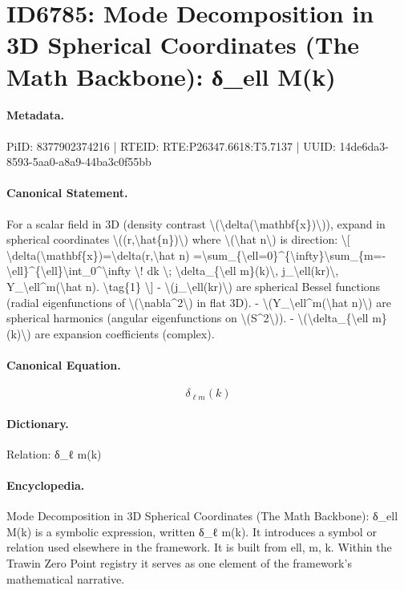 \section*{ID6785: Mode Decomposition in 3D Spherical Coordinates (The Math Backbone): δ\_ell M(k)}
\paragraph{Metadata.}
PiID: 8377902374216 | RTEID: RTE:P26347.6618:T5.7137 | UUID: 14de6da3-8593-5aa0-a8a9-44ba3c0f55bb

\paragraph{Canonical Statement.}
For a scalar field in 3D (density contrast \textbackslash{}(\textbackslash{}delta(\textbackslash{}mathbf\{x\})\textbackslash{})), expand in spherical coordinates \textbackslash{}((r,\textbackslash{}hat\{n\})\textbackslash{}) where \textbackslash{}(\textbackslash{}hat n\textbackslash{}) is direction: \textbackslash{}[ \textbackslash{}delta(\textbackslash{}mathbf\{x\})=\textbackslash{}delta(r,\textbackslash{}hat n) =\textbackslash{}sum\_\{\textbackslash{}ell=0\}\textasciicircum{}\{\textbackslash{}infty\}\textbackslash{}sum\_\{m=-\textbackslash{}ell\}\textasciicircum{}\{\textbackslash{}ell\}\textbackslash{}int\_0\textasciicircum{}\textbackslash{}infty \textbackslash{}! dk \textbackslash{}; \textbackslash{}delta\_\{\textbackslash{}ell m\}(k)\textbackslash{}, j\_\textbackslash{}ell(kr)\textbackslash{}, Y\_\textbackslash{}ell\textasciicircum{}m(\textbackslash{}hat n). \textbackslash{}tag\{1\} \textbackslash{}] - \textbackslash{}(j\_\textbackslash{}ell(kr)\textbackslash{}) are spherical Bessel functions (radial eigenfunctions of \textbackslash{}(\textbackslash{}nabla\textasciicircum{}2\textbackslash{}) in flat 3D). - \textbackslash{}(Y\_\textbackslash{}ell\textasciicircum{}m(\textbackslash{}hat n)\textbackslash{}) are spherical harmonics (angular eigenfunctions on \textbackslash{}(S\textasciicircum{}2\textbackslash{})). - \textbackslash{}(\textbackslash{}delta\_\{\textbackslash{}ell m\}(k)\textbackslash{}) are expansion coefficients (complex).

\paragraph{Canonical Equation.}
\[
\delta_{\ell m}(k)
\]

\paragraph{Dictionary.}
Relation: δ\_ℓ m(k)

\paragraph{Encyclopedia.}
Mode Decomposition in 3D Spherical Coordinates (The Math Backbone): δ\_ell M(k) is a symbolic expression, written δ\_ℓ m(k). It introduces a symbol or relation used elsewhere in the framework. It is built from ell, m, k. Within the Trawin Zero Point registry it serves as one element of the framework's mathematical narrative.
